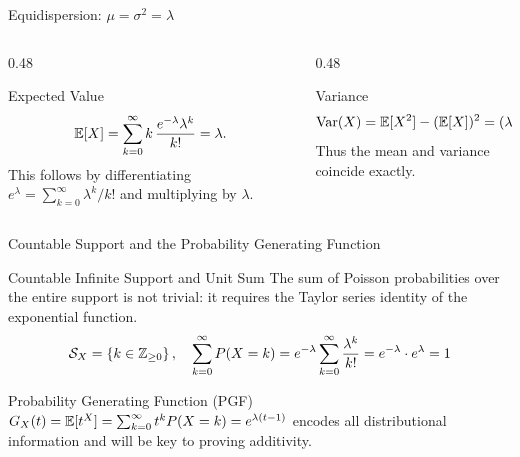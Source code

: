 \documentclass[aspectratio=169,xcolor={dvipsnames,table}]{beamer}
\begin{document}
\begin{frame}{Equidispersion: $\mu = \sigma^{2} = \lambda$}
	\vspace{-0.15cm}
	\begin{columns}[T]
		\begin{column}{0.48\textwidth}
			\begin{block}{Expected Value}
				\scriptsize
				$$\mathbb{E}[X]=\sum_{k=0}^{\infty}k\,\dfrac{e^{-\lambda}\lambda^k}{k!}=\lambda.$$
				This follows by differentiating $e^\lambda=\sum_{k=0}^{\infty}\lambda^k/k!$ and multiplying by $\lambda$.
			\end{block}
		\end{column}
		\begin{column}{0.48\textwidth}
			\begin{alertblock}{Variance}
				\scriptsize
				$$\operatorname{Var}(X)=\mathbb{E}[X^2]-(\mathbb{E}[X])^2=(\lambda^2+\lambda)-\lambda^2=\lambda.$$
				Thus the mean and variance coincide exactly.
			\end{alertblock}
		\end{column}
	\end{columns}
\end{frame}

\begin{frame}{Countable Support and the Probability Generating Function}
	\vspace{-0.15cm}
	\begin{block}{Countable Infinite Support and Unit Sum}
		\scriptsize
		The sum of Poisson probabilities over the entire support is not trivial: it requires the Taylor series identity of the exponential function.
		$$\mathcal{S}_X = \left\{ k \in \mathbb{Z}_{\ge 0} \right\}, \quad \sum_{k=0}^{\infty} P(X = k) = e^{-\lambda} \sum_{k=0}^{\infty} \dfrac{\lambda^{k}}{k!} = e^{-\lambda} \cdot e^{\lambda} = 1$$
	\end{block}
	\vspace{-0.15cm}
	\begin{alertblock}{Probability Generating Function (PGF)}
		\scriptsize
		$G_{X}(t) = \mathbb{E}[t^{X}] = \sum_{k=0}^{\infty} t^{k} P(X=k) = e^{\lambda(t-1)}$ encodes all distributional information and will be key to proving additivity.
	\end{alertblock}
\end{frame}
\end{document}
